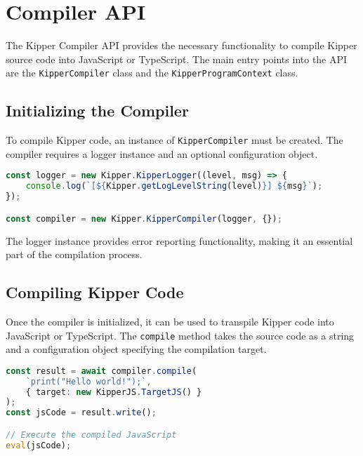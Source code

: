 
\section{Compiler API}
\label{sec:compiler_api}

The Kipper Compiler API provides the necessary functionality to compile Kipper source code into JavaScript or TypeScript. The main entry points into the API are the \lstinline|KipperCompiler| class and the \lstinline|KipperProgramContext| class.

\subsection{Initializing the Compiler}
\label{subsec:compiler_init}

To compile Kipper code, an instance of \lstinline|KipperCompiler| must be created. The compiler requires a logger instance and an optional configuration object.

\begin{lstlisting}[language=Typescript, caption=Initializing the Kipper Compiler, label=lst:compiler_initialization]
const logger = new Kipper.KipperLogger((level, msg) => {
	console.log(`[${Kipper.getLogLevelString(level)}] ${msg}`);
});

const compiler = new Kipper.KipperCompiler(logger, {});
\end{lstlisting}

The logger instance provides error reporting functionality, making it an essential part of the compilation process.

\subsection{Compiling Kipper Code}
\label{subsec:compiling}

Once the compiler is initialized, it can be used to transpile Kipper code into JavaScript or TypeScript. The \lstinline|compile| method takes the source code as a string and a configuration object specifying the compilation target.

\begin{lstlisting}[language=Typescript, caption=Compiling Kipper Code to JavaScript, label=lst:compile_example]
const result = await compiler.compile(
	`print("Hello world!");`,
	{ target: new KipperJS.TargetJS() }
);
const jsCode = result.write();

// Execute the compiled JavaScript
eval(jsCode);
\end{lstlisting}

